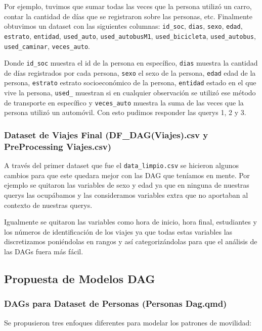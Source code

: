 \documentclass[12pt,a4paper]{article}
\begin{document}
Por ejemplo, tuvimos que sumar todas las veces que la persona utilizó un carro, contar la cantidad de días que se registraron sobre las personas, etc. Finalmente obtuvimos un dataset con las siguientes columnas: \texttt{id\_soc}, \texttt{dias}, \texttt{sexo}, \texttt{edad}, \texttt{estrato}, \texttt{entidad}, \texttt{used\_auto}, \texttt{used\_autobusM1}, \texttt{used\_bicicleta}, \texttt{used\_autobus}, \texttt{used\_caminar}, \texttt{veces\_auto}.

Donde \texttt{id\_soc} muestra el id de la persona en específico, \texttt{dias} muestra la cantidad de días registrados por cada persona, \texttt{sexo} el sexo de la persona, \texttt{edad} edad de la persona, \texttt{estrato} estrato socioeconómico de la persona, \texttt{entidad} estado en el que vive la persona, \texttt{used\_} muestran si en cualquier observación se utilizó ese método de transporte en específico y \texttt{veces\_auto} muestra la suma de las veces que la persona utilizó un automóvil. Con esto pudimos responder las querys 1, 2 y 3.

\subsubsection{Dataset de Viajes Final (DF\_DAG(Viajes).csv y PreProcessing Viajes.csv)}

A través del primer dataset que fue el \texttt{data\_limpio.csv} se hicieron algunos cambios para que este quedara mejor con las DAG que teníamos en mente. Por ejemplo se quitaron las variables de sexo y edad ya que en ninguna de nuestras querys las ocupábamos y las consideramos variables extra que no aportaban al contexto de nuestras querys. 

Igualmente se quitaron las variables como hora de inicio, hora final, estudiantes y los números de identificación de los viajes ya que todas estas variables las discretizamos poniéndolas en rangos y así categorizándolas para que el análisis de las DAGs fuera más fácil.


\subsection{Propuesta de Modelos DAG}

\subsubsection{DAGs para Dataset de Personas (Personas Dag.qmd)}

Se propusieron tres enfoques diferentes para modelar los patrones de movilidad:
\end{document}
